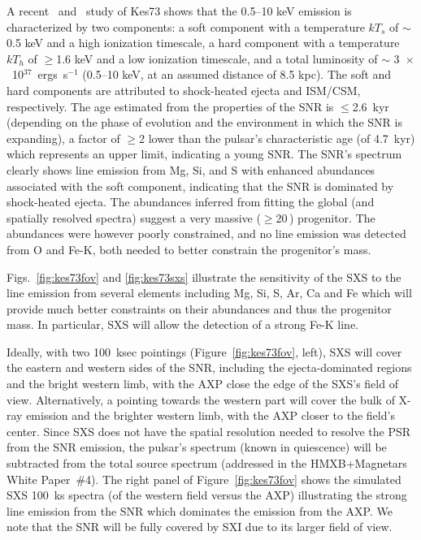 \documentclass[11pt,a4paper]{article}
\begin{document}
{A recent \chandra\ and \xmm\ study of Kes73 \citep{kumar2014} shows
that the 0.5--10 keV emission is characterized by two components: a
soft component with a temperature $kT_s$ of $\sim$0.5 keV and a
high ionization timescale, a hard component with a temperature $kT_h$
of $\geq$1.6 keV and a low ionization timescale, and a total
luminosity of $\sim$ 3~$\times$~10$^{37}$~ergs~s$^{-1}$ (0.5--10 keV,
at an assumed distance of 8.5 kpc).  The soft and hard components
are attributed to shock-heated ejecta and ISM/CSM, respectively. 
The age estimated from the
properties of the SNR is $\leq$2.6~kyr (depending on the phase of
evolution and the environment in which the SNR is expanding), a factor
of $\geq$2 lower than the pulsar's characteristic age (of 4.7~kyr)
which represents an upper limit, indicating a young SNR.  The SNR's
spectrum clearly shows line emission from Mg, Si, and S with enhanced
abundances associated with the soft component, indicating that the SNR
is dominated by shock-heated ejecta.  The abundances inferred from
fitting the global (and spatially resolved spectra) suggest a very
massive ($\geq$20\,\msun) progenitor.  The abundances were however
poorly constrained, and no line emission was detected from O and Fe-K,
both needed to better constrain the progenitor's mass.


Figs.~\ref{fig:kes73fov} and \ref{fig:kes73sxs} illustrate the
sensitivity of the SXS to the line emission from several elements
including Mg, Si, S, Ar, Ca and Fe which will provide much better
constraints on their abundances and thus the progenitor mass.
In particular, SXS will allow the detection of a strong Fe-K line.


Ideally, with two 100~ksec pointings (Figure~\ref{fig:kes73fov}, left), 
SXS will cover the eastern and western sides of the SNR, including
the ejecta-dominated regions and the bright western limb, with the AXP
close the edge of the SXS's field of view.  
Alternatively, a pointing towards the western part will cover the bulk of X-ray
emission and the brighter western limb, with the AXP closer to
the field's center.
Since SXS does not have the
spatial resolution needed to resolve the PSR from the SNR emission,
the pulsar's spectrum (known in quiescence) will be subtracted from
the total source spectrum (addressed in the HMXB+Magnetars White Paper~\#4).  
The right panel of Figure~\ref{fig:kes73fov} shows the simulated SXS 100~ks
spectra (of the western field versus the AXP) illustrating the strong
line emission from the SNR which dominates the emission from the AXP.
We note that the SNR will be fully covered by SXI due to its larger 
field of view.


}
\end{document}
